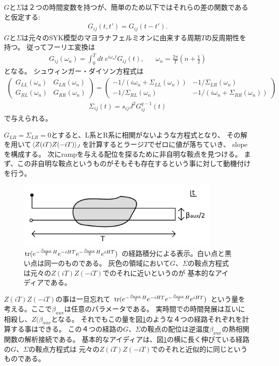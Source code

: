 $G$と$\Sigma$は２つの時間変数を持つが、簡単のため以下ではそれらの差の関数であると仮定する:
\begin{align}
	G_{ij}(t, t') = G_{ij}(t - t').
\end{align}
$G$と$\Sigma$は元々のSYK模型のマヨラナフェルミオンに由来する周期$T$の反周期性を持つ。
従ってフーリエ変換は
\begin{align}
	G_{ij}(\omega_n) = \int_0^T dt\ e^{i\omega_nt}G_{ij}(t),
	\hspace{20pt}\omega_n = \frac{2\pi}{T}\left(n + \frac{1}{2}\right)
\end{align}
となる。
シュウィンガー・ダイソン方程式は
\begin{align}
	\begin{pmatrix}
		G_{LL}(\omega_n) & G_{LR}(\omega_n)\\
		G_{RL}(\omega_n) & G_{RR}(\omega_n)
	\end{pmatrix}
	=
	\begin{pmatrix}
		-1/(i\omega_n + \Sigma_{LL}(\omega_n)) & -1/\Sigma_{LR}(\omega_n)\\
		-1/\Sigma_{RL}(\omega_n) & -1/(i\omega_n + \Sigma_{RR}(\omega_n))
	\end{pmatrix}
	\label{eq:replica_SDeq_1}
\end{align}
\begin{align}
	\Sigma_{ij}(t) = s_{ij}J^2G_{ij}^{q-1}(t)
	\label{eq:replica_SDeq_2}
\end{align}
で与えられる。

$G_{LR} = \Sigma_{LR} = 0$とすると、L系とR系に相関がないような方程式となり、
その解を用いて$\langle Z(iT)Z(-iT) \rangle_J$を計算するとラージ$T$でゼロに値が落ちていき、
slopeを構成する。
次にrampを与える配位を探るために非自明な鞍点を見つける。
まず、この非自明な鞍点というものがそもそも存在するという事に対して動機付けを行う。

\begin{figure}[ht]
	\centering
	\includegraphics[width=10cm]{figures/beta_aux}
	\caption{$\mathrm{tr}(e^{-\frac{\beta_{aux}}{2}H}e^{-iHT}e^{-\frac{\beta_{aux}}{2}H}e^{iHT})$
		の経路積分による表示。白い点と黒い点は同一のものである。
		灰色の領域において$G$、$\Sigma$の鞍点方程式は元々の$Z(iT)Z(-iT)$でのそれに近いというのが
		基本的なアイディアである。
	}
	\label{fig:beta_aux}
\end{figure}
$Z(iT)Z(-iT)$の事は一旦忘れて
$\mathrm{tr}(e^{-\frac{\beta_{aux}}{2}H}e^{-iHT}e^{-\frac{\beta_{aux}}{2}H}e^{iHT})$
という量を考える。ここで$\beta_{aux}$は任意のパラメータである。
実時間での時間発展は互いに相殺し、$Z(\beta_{aux}$となる。
それでもこの量を図\ref{fig:beta_aux}のような４つの経路それぞれを計算する事はできる。
この４つの経路の$G$、$\Sigma$の鞍点の配位は逆温度$\beta_{aux}$の熱相関関数の解析接続である。
基本的なアイディアは、図\ref{fig:beta_aux}の横に長く伸びている経路の$G$、$\Sigma$の鞍点方程式は
元々の$Z(iT)Z(-iT)$でのそれと近似的に同じというものである。

